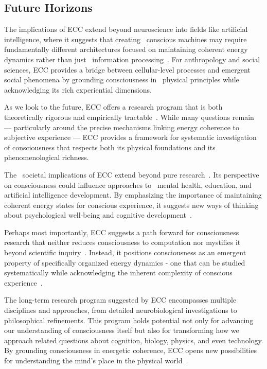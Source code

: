 \subsection*{Future Horizons}

The implications of ECC extend beyond neuroscience into fields like artificial intelligence, where it suggests that creating~ conscious machines may require fundamentally different architectures focused on maintaining coherent energy dynamics rather than just~ information processing~\cite{chalmers2010character}. For anthropology and social sciences, ECC provides a bridge between cellular-level processes and emergent social phenomena by grounding consciousness in~ physical principles while acknowledging its rich experiential dimensions.

As we look to the future, ECC offers a research program that is both theoretically rigorous and empirically tractable~\cite{seth2021being, da2024mathematical}. While many questions remain — particularly around the precise mechanisms linking energy coherence to~ subjective experience — ECC provides a framework for systematic investigation of consciousness that respects both its physical foundations and its~ phenomenological richness.

The~ societal implications of ECC extend beyond pure research~\cite{feinberg2016ancient}. Its perspective on consciousness could influence approaches to~ mental health, education, and artificial intelligence development. By emphasizing the importance of maintaining coherent energy states for conscious experience, it suggests new ways of thinking about psychological well-being and cognitive development~\cite{zahavi2014self, pinotsis2023vivo}.

Perhaps most importantly, ECC suggests a path forward for consciousness research that neither reduces consciousness to computation nor mystifies it beyond scientific inquiry~\cite{chalmers2010character}. Instead, it positions consciousness as an emergent property of specifically organized energy dynamics - one that can be studied systematically while acknowledging the inherent complexity of conscious experience~\cite{seth2021being, da2024mathematical}.

The long-term research program suggested by ECC encompasses multiple disciplines and approaches, from detailed neurobiological investigations to philosophical refinements. This program holds potential not only for advancing our understanding of consciousness itself but also for transforming how we approach related questions about cognition, biology, physics, and even technology. By grounding consciousness in energetic coherence, ECC opens new possibilities for understanding the mind's place in the physical world~\cite{goff2019galileo, thompson2010mind}.


